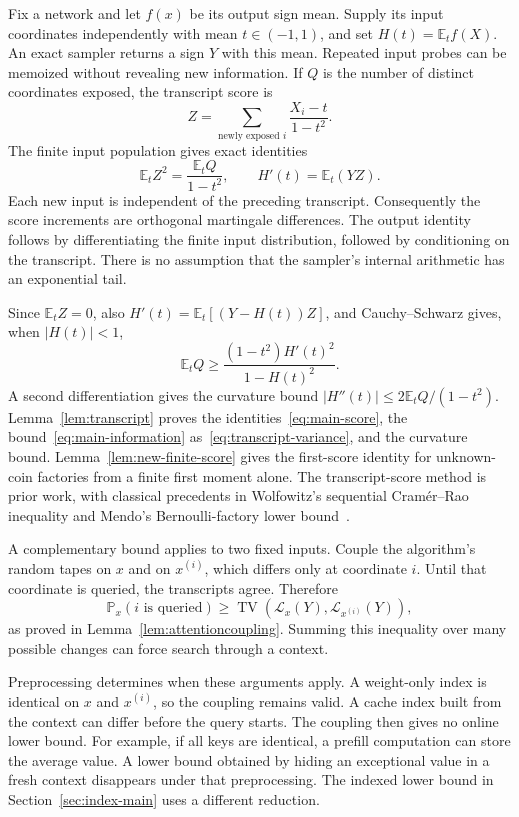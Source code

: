 \documentclass[11pt]{article}
\theoremstyle{definition}
\theoremstyle{remark}
\newcommand{\E}{\mathbb E}
\newcommand{\PP}{\mathbb P}
\DeclareMathOperator{\TV}{TV}
\numberwithin{equation}{section}
\begin{document}
Fix a network and let $f(x)$ be its output sign mean. Supply its
input coordinates independently with mean $t\in(-1,1)$, and set
$H(t)=\E_t f(X)$. An exact sampler returns a sign $Y$ with this
mean. Repeated input probes can be memoized without revealing new
information. If $Q$ is the number of distinct coordinates exposed,
the transcript score is
\[
 Z=\sum_{\text{newly exposed }i}\frac{X_i-t}{1-t^2}.
\]
The finite input population gives exact identities
\begin{equation}
 \E_t Z^2=\frac{\E_t Q}{1-t^2},\qquad
 H'(t)=\E_t(YZ).
 \label{eq:main-score}
\end{equation}
Each new input is independent of the preceding transcript.
Consequently the score increments are orthogonal martingale
differences. The output identity follows by differentiating the
finite input distribution, followed by conditioning on the transcript.
There is no assumption that the sampler's internal arithmetic has
an exponential tail.

Since $\E_tZ=0$, also $H'(t)=\E_t[(Y-H(t))Z]$, and Cauchy--Schwarz gives,
when $|H(t)|<1$,
\begin{equation}
 \E_t Q\ge
 \frac{(1-t^2)H'(t)^2}{1-H(t)^2}.
 \label{eq:main-information}
\end{equation}
A second differentiation gives the curvature bound
$|H''(t)|\le 2\E_tQ/(1-t^2)$. Lemma~\ref{lem:transcript} proves the
identities~\eqref{eq:main-score}, the bound~\eqref{eq:main-information}
as~\eqref{eq:transcript-variance}, and the curvature bound. Lemma~\ref{lem:new-finite-score} gives
the first-score identity for unknown-coin factories from a finite
first moment alone. The transcript-score method is prior work, with
classical precedents in Wolfowitz's sequential Cram\'er--Rao
inequality and Mendo's Bernoulli-factory lower
bound~\cite{wolfowitz1947,mendo2019}.

A complementary bound applies to two fixed inputs. Couple the
algorithm's random tapes on $x$ and on $x^{(i)}$, which differs
only at coordinate $i$. Until that coordinate is queried, the
transcripts agree. Therefore
\begin{equation}
 \PP_x(i\text{ is queried})
 \ge \TV(\mathcal L_x(Y),\mathcal L_{x^{(i)}}(Y)),
 \label{eq:main-coupling}
\end{equation}
as proved in Lemma~\ref{lem:attentioncoupling}. Summing this
inequality over many possible changes can force search through a
context.

Preprocessing determines when these arguments apply. A weight-only
index is identical on $x$ and $x^{(i)}$, so the coupling remains
valid. A cache index built from the context can differ before the
query starts. The coupling then gives no online lower bound.
For example, if all keys are identical, a prefill computation can
store the average value. A lower bound obtained by hiding an
exceptional value in a fresh context disappears under that
preprocessing. The indexed lower bound in Section~\ref{sec:index-main}
uses a different reduction.
\end{document}
